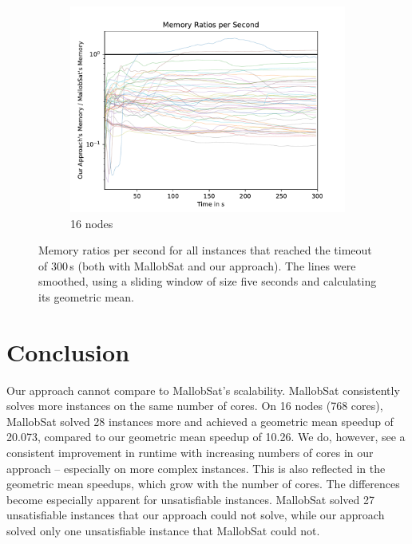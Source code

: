 \documentclass[12pt,a4paper,twoside]{scrartcl}
\numberwithin{equation}{section}
\begin{document}
\begin{figure}
\begin{subfigure}[c]{.45\textwidth}
    \includegraphics[scale=.45]{plots/16node_compare/mem_ratio_per_second.pdf}
    \caption{16 nodes}
  \end{subfigure}
  \caption{Memory ratios per second for all instances that reached the timeout of $300\,$s (both with MallobSat and our approach). The lines were smoothed, using a sliding window of size five seconds and calculating its geometric mean.}
  \label{fig:memRatiosSecs}
\end{figure}



\section{Conclusion}

Our approach cannot compare to MallobSat's scalability. MallobSat consistently solves more instances on the same number of cores. On 16 nodes (768 cores), MallobSat solved 28 instances more and achieved a geometric mean speedup of 20.073, compared to our geometric mean speedup of 10.26. We do, however, see a consistent improvement in runtime with increasing numbers of cores in our approach -- especially on more complex instances. This is also reflected in the geometric mean speedups, which grow with the number of cores. The differences become especially apparent for unsatisfiable instances. MallobSat solved 27 unsatisfiable instances that our approach could not solve, while our approach solved only one unsatisfiable instance that MallobSat could not.
\end{document}
